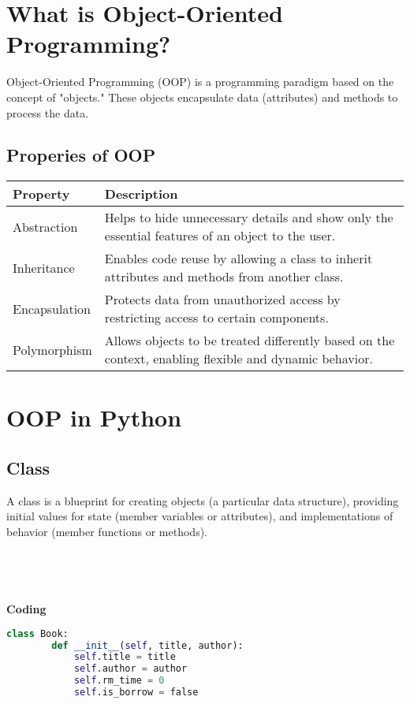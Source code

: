 \section{What is Object-Oriented Programming?}

Object-Oriented Programming (OOP) is a programming paradigm based on the concept of "objects." These objects encapsulate data (attributes) and methods to process the data.


\subsection{Properies of OOP}
\begin{table}[!h]
	\centering
	\begin{tabular}{|p{3cm}|p{9cm}|}
		\hline
		\textbf{Property} & \textbf{Description} \\ \hline
		Abstraction & Helps to hide unnecessary details and show only the essential features of an object to the user. \\ \hline
		Inheritance & Enables code reuse by allowing a class to inherit attributes and methods from another class. \\ \hline
		Encapsulation & Protects data from unauthorized access by restricting access to certain components. \\ \hline
		Polymorphism & Allows objects to be treated differently based on the context, enabling flexible and dynamic behavior. \\ \hline
	\end{tabular}
\end{table}

\section{OOP in Python}
\subsection{Class}
A class is a blueprint for creating objects (a particular data structure), providing initial values for state (member variables or attributes), and implementations of behavior (member functions or methods).\\
\\
\\
\\
\\

\textbf{Coding}
\begin{lstlisting}[language=python, caption={Define Book class}]
	class Book:
		def __init__(self, title, author):
			self.title = title
			self.author = author
			self.rm_time = 0
			self.is_borrow = false
\end{lstlisting}

